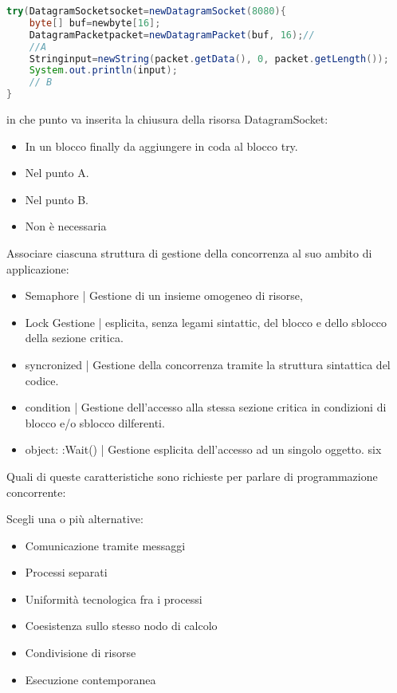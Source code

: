 \documentclass{article}
\begin{document}
\begin{lstlisting}[language=Java]
try(DatagramSocketsocket=newDatagramSocket(8080){
    byte[] buf=newbyte[16];
    DatagramPacketpacket=newDatagramPacket(buf, 16);// 
    //A
    Stringinput=newString(packet.getData(), 0, packet.getLength());
    System.out.println(input);
    // B
}
\end{lstlisting}

in che punto va inserita la chiusura della risorsa DatagramSocket:
\begin{itemize}
	\item In un blocco finally da aggiungere in coda al blocco try.
	\item Nel punto A.
	\item Nel punto B.
	\item \checkmark Non è necessaria
\end{itemize}

Associare ciascuna struttura di gestione della concorrenza al suo ambito di applicazione:

\begin{itemize}
	\item Semaphore | Gestione di un insieme omogeneo di risorse,
	\item Lock Gestione | esplicita, senza legami sintattic, del blocco e dello sblocco della sezione critica.
	\item syncronized | Gestione della concorrenza tramite la struttura sintattica del codice.
	\item condition | Gestione dell'accesso alla stessa sezione critica in condizioni di blocco e/o sblocco dilferenti. 
	\item object: :Wait() | Gestione esplicita dell'accesso ad un singolo oggetto. six
\end{itemize}

Quali di queste caratteristiche sono richieste per parlare di programmazione concorrente:

Scegli una o più alternative:

\begin{itemize}
	\item Comunicazione tramite messaggi
	\item \checkmark Processi separati
	\item Uniformità tecnologica fra i processi
	\item \checkmark Coesistenza sullo stesso nodo di calcolo 
	\item \checkmark Condivisione di risorse
	\item \checkmark Esecuzione contemporanea 
\end{itemize}
\end{document}
